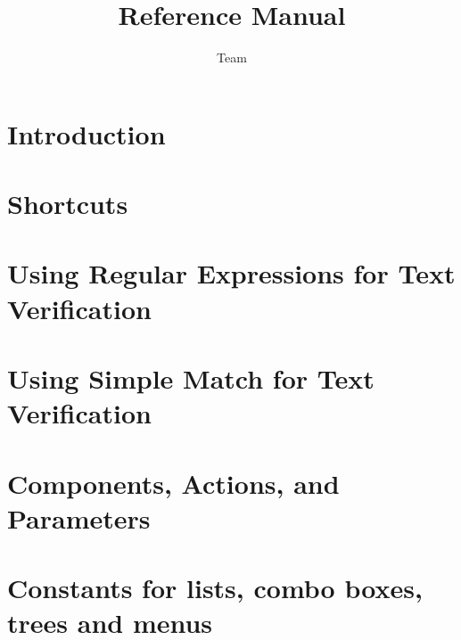 \documentclass[en,a4paper,twoside,manual,guidancer]{bxreport}
\begin{document}
\title{\jb{} Reference Manual}
\author*{\jb{} Team}{}
\maketitle

\tableofcontents
\renewcommand{\bxcomment}[2]{}%
\clearpage

\chapter{Introduction}

\clearpage

\chapter{Shortcuts}

\clearpage

\chapter{Using Regular Expressions for Text Verification}
\label{regex}

\clearpage

\chapter{Using Simple Match for Text Verification}
\label{simplematch}

\clearpage

\chapter{Components, Actions, and Parameters}
 \label{actparam}
 
 \clearpage

\chapter{Constants for lists, combo boxes, trees and menus}
\label{constants}

\clearpage
\end{document}
